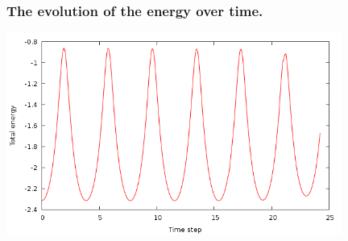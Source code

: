\documentclass[10pt]{beamer}
\begin{document}

\begin{frame}
\frametitle{The evolution of the energy over time.}

\centering
\includegraphics[width=11cm]{fig/enh2}
\end{frame}




\begin{frame}
~~
\end{frame}



\end{document}
